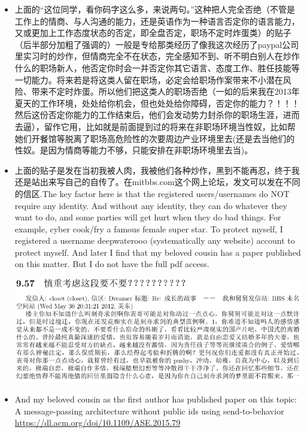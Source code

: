 \documentclass[9pt, b5paper]{article}
\begin{document}
\begin{enumerate}
\begin{enumerate}
\begin{itemize}
\item 上面的“这位同学，看你码字这么多，来说两句。”这种把人完全否绝（不管是工作上的情商、与人沟通的能力，还是英语作为一种语言否定你的语言能力，又或更加上工作态度状态的否定，即全盘否定，职场不定时炸蛋类）的贴子（后半部分加粗了强调的）一般是专给那类经历了像我这次经历了paypal公司里实习时的炒作，但情商完全不在状态，完全感知不到、听不明白别人在炒作什么的职场新人，他否定你时会一并否定你其它语言、态度工作、胜任技能等一切能力。将来若是将这类人留在职场，必定会给职场作案带来不小潜在风险、带来不定时炸蛋。所以他们把这类人的职场否绝（一如的后来我在2013年夏天的工作环境，处处给你机会，但也处处给你障碍，否定你的能力？！！！然后这份否定你能力的工作结束后，他们会发动势力封杀你的职场生涯，进而去逼），留作它用，比如就是前面提到过的将来在非职场环境当性奴，比如帮她们开餐馆等脱离了职场高危险性的次要周边产业环境里去(还是去当他们的性奴。是因为情商等能力不够，只能安排在非职场环境里去当)。
\item 上面的贴子是发在当初我被人肉，我被他们各种炒作，黑到不能再忍，终于我还是站出来写自己的自传了。在mitbbs.com这个网上论坛，发文可以发在不同的信区.The key factor here is that the registered users/usernames do NOT require any identity. And without any identity, they can do whatever they want to do, and some parties will get hurt when they do bad things. For example, cyber cook/fry a famous female super star. To protect myself, I registered a username deepwaterooo (systematically any website) account to protect myself. And later I find that my beloved cousin has a paper published on this matter. But I do not have the full pdf access. 

\begin{center}
\includegraphics[width=.9\linewidth]{./pic/p1p108_NoIDsPosts.png}
\end{center}
\item And my beloved cousin as the first author has published paper on this topic: A message-passing architecture without public ids using send-to-behavior \url{https://dl.acm.org/doi/10.1109/ASE.2015.79}


\end{itemize}
\end{enumerate}
\end{enumerate}
\end{document}
